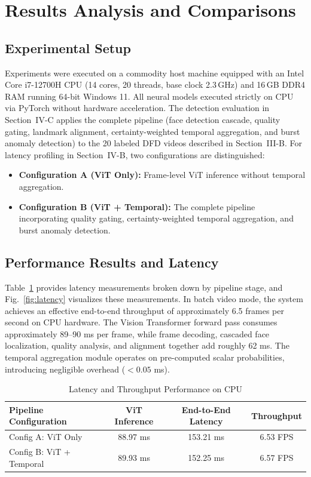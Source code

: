\documentclass[conference]{IEEEtran}
\begin{document}
\section{Results Analysis and Comparisons}

\subsection{Experimental Setup}
Experiments were executed on a commodity host machine equipped with an Intel Core i7-12700H CPU (14 cores, 20 threads, base clock 2.3\,GHz) and 16\,GB DDR4 RAM running 64-bit Windows 11. All neural models executed strictly on CPU via PyTorch without hardware acceleration. The detection evaluation in Section~IV-C applies the complete pipeline (face detection cascade, quality gating, landmark alignment, certainty-weighted temporal aggregation, and burst anomaly detection) to the 20 labeled DFD videos described in Section~III-B. For latency profiling in Section~IV-B, two configurations are distinguished:
\begin{itemize}
\item \textbf{Configuration A (ViT Only):} Frame-level ViT inference without temporal aggregation.
\item \textbf{Configuration B (ViT + Temporal):} The complete pipeline incorporating quality gating, certainty-weighted temporal aggregation, and burst anomaly detection.
\end{itemize}

\subsection{Performance Results and Latency}
Table~\ref{tab:latency} provides latency measurements broken down by pipeline stage, and Fig.~\ref{fig:latency} visualizes these measurements. In batch video mode, the system achieves an effective end-to-end throughput of approximately 6.5 frames per second on CPU hardware. The Vision Transformer forward pass consumes approximately 89--90 ms per frame, while frame decoding, cascaded face localization, quality analysis, and alignment together add roughly 62 ms. The temporal aggregation module operates on pre-computed scalar probabilities, introducing negligible overhead ($<0.05$ ms).

\begin{table}[htbp]
\caption{Latency and Throughput Performance on CPU}
\label{tab:latency}
\centering
\setlength{\tabcolsep}{3pt}
\scriptsize
\begin{tabular}{|l|c|c|c|}
\hline
\textbf{Pipeline Configuration} & \textbf{ViT Inference} & \textbf{End-to-End Latency} & \textbf{Throughput} \\
\hline
Config A: ViT Only & 88.97 ms & 153.21 ms & 6.53 FPS \\
Config B: ViT + Temporal & 89.93 ms & 152.25 ms & 6.57 FPS \\
\hline
\end{tabular}
\end{table}
\end{document}
